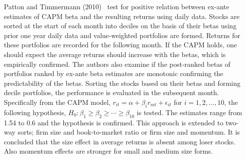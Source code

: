 Patton and Timmermann (2010)~\cite{pattim} test for positive relation between ex-ante estimates of CAPM beta and the resulting returns using daily data. Stocks are sorted at the start of each month into deciles on the basis of their betas using prior one year daily data and value-weighted portfolios are formed. Returns for these portfolios are recorded for the following month. If the CAPM holds, one should expect the average returns should increase with the betas, which is empirically confirmed. The authors also examine if the post-ranked betas of portfolios ranked by ex-ante beta estimates are monotonic confirming the predictability of the betas. Sorting the stocks based on their betas and forming decile portfolios, the performance is evaluated in the subsequent month. Specifically from the CAPM model, $r_{it}= \alpha + \beta_i r_{mt} + \epsilon_{it}$ for $i= 1, 2, \ldots, 10$, the following hypothesis, $H_0: \beta_1 \geq \beta_2 \geq \cdots \geq \beta_{10}$ is tested. The estimates range from 1.54 to 0.6 and the hypothesis is confirmed. This approach is extended to two-way sorts; firm size and book-to-market ratio or firm size and momentum. It is concluded that the size effect in average returns is absent among loser stocks. Also momentum effects are stronger for small and medium size forms. \twomedskip


